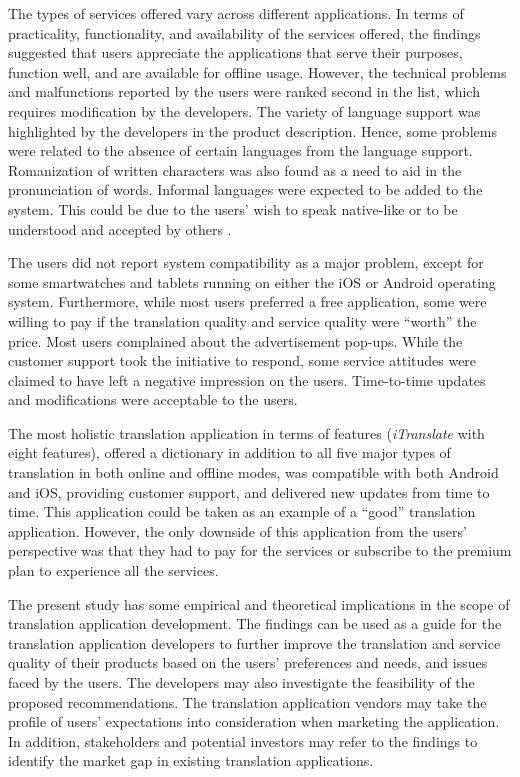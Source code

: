 \documentclass[english]{textolivre}
\begin{document}
The types of services offered vary across different applications. In terms of practicality, functionality, and availability of the services offered, the findings suggested that users appreciate the applications that serve their purposes, function well, and are available for offline usage. However, the technical problems and malfunctions reported by the users were ranked second in the list, which requires modification by the developers. The variety of language support was highlighted by the developers in the product description. Hence, some problems were related to the absence of certain languages from the language support. Romanization of written characters was also found as a need to aid in the pronunciation of words. Informal languages were expected to be added to the system. This could be due to the users’ wish to speak native-like or to be understood and accepted by others \cite{herman_technical_1993}.

The users did not report system compatibility as a major problem, except for some smartwatches and tablets running on either the iOS or Android operating system. Furthermore, while most users preferred a free application, some were willing to pay if the translation quality and service quality were “worth” the price. Most users complained about the advertisement pop-ups. While the customer support took the initiative to respond, some service attitudes were claimed to have left a negative impression on the users. Time-to-time updates and modifications were acceptable to the users.

The most holistic translation application in terms of features (\textit{iTranslate} with eight features), offered a dictionary in addition to all five major types of translation in both online and offline modes, was compatible with both Android and iOS, providing customer support, and delivered new updates from time to time. This application could be taken as an example of a “good” translation application. However, the only downside of this application from the users’ perspective was that they had to pay for the services or subscribe to the premium plan to experience all the services.

The present study has some empirical and theoretical implications in the scope of translation application development. The findings can be used as a guide for the translation application developers to further improve the translation and service quality of their products based on the users’ preferences and needs, and issues faced by the users. The developers may also investigate the feasibility of the proposed recommendations. The translation application vendors may take the profile of users’ expectations into consideration when marketing the application. In addition, stakeholders and potential investors may refer to the findings to identify the market gap in existing translation applications.
\end{document}
